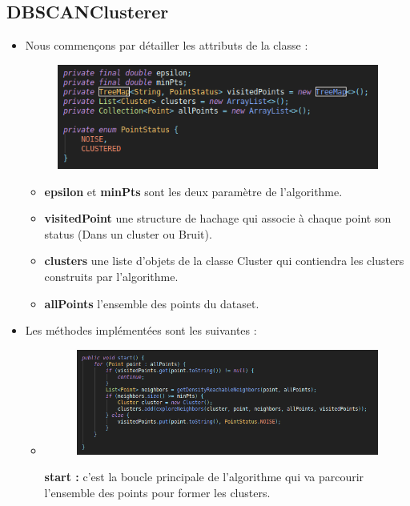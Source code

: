 	\subsection{DBSCANClusterer}
		\begin{itemize}
			\item Nous commençons par détailler les attributs de la classe : 
			\begin{figure}[H]
				\centering
				\includegraphics[width=0.75\linewidth]{dbscan/images/dbscan/props.png}
			\end{figure}
			\begin{itemize}
				\item \textbf{epsilon} et \textbf{minPts} sont les deux paramètre de l'algorithme.
				\item \textbf{visitedPoint} une structure de hachage qui associe à chaque point son status (Dans un cluster ou Bruit).
				\item \textbf{clusters} une liste d'objets de la classe Cluster qui contiendra les clusters construits par l'algorithme.
				\item \textbf{allPoints} l'ensemble des points du dataset.
			\end{itemize}
			\item Les méthodes implémentées sont les suivantes : 
			\begin{itemize}
				\item \begin{figure}[H]
					\centering
					\includegraphics[width=0.75\linewidth]{dbscan/images/dbscan/start.png}
				\end{figure} \textbf{start : } c'est la boucle principale de l'algorithme qui va parcourir l'ensemble des points pour former les clusters.
			

\end{itemize}
\end{itemize}

